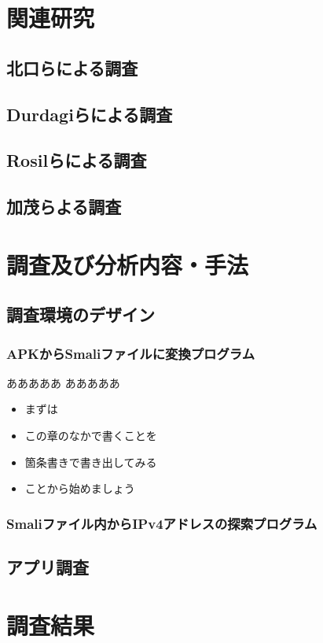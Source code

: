 \documentclass[a4j]{jarticle}
\begin{document}
\newpage
\section{関連研究} %
\subsection{北口らによる調査}

\subsection{Durdagiらによる調査}

\subsection{Rosilらによる調査}

\subsection{加茂らよる調査}


\newpage
\section{調査及び分析内容・手法}
\subsection{調査環境のデザイン}
\subsubsection{APKからSmaliファイルに変換プログラム}
あああああ
あああああ
\begin{itemize}
\item まずは
\item この章のなかで書くことを
\item 箇条書きで書き出してみる
\item ことから始めましょう
\end{itemize}
\subsubsection{Smaliファイル内からIPv4アドレスの探索プログラム}
\subsection{アプリ調査}

\newpage
\section{調査結果}
\end{document}
